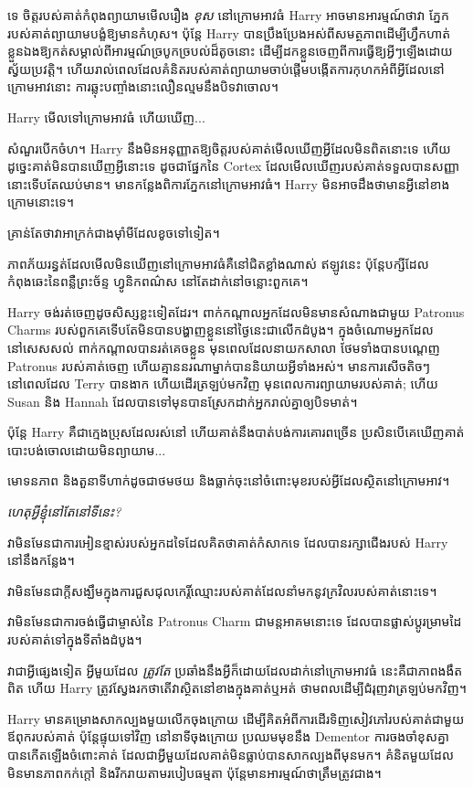 ទេ ចិត្តរបស់គាត់កំពុងព្យាយាមមើលរឿង \emph{ខុស} នៅក្រោមអាវធំ Harry អាចមានអារម្មណ៍ថាវា ភ្នែករបស់គាត់ព្យាយាមបង្ខំឱ្យមានកំហុស។ ប៉ុន្តែ Harry បានប្រឹងប្រែងអស់ពីសមត្ថភាពដើម្បីហ្វឹកហាត់ខ្លួនឯងឱ្យកត់សម្គាល់ពីអារម្មណ៍ច្របូកច្របល់ដ៏តូចនោះ ដើម្បីដកខ្លួនចេញពីការធ្វើឱ្យអ្វីៗឡើងដោយស្វ័យប្រវត្តិ។ ហើយរាល់ពេលដែលគំនិតរបស់គាត់ព្យាយាមចាប់ផ្តើមបង្កើតការកុហកអំពីអ្វីដែលនៅក្រោមអាវនោះ ការឆ្លុះបញ្ចាំងនោះលឿនល្មមនឹងបិទវាចោល។

Harry មើលទៅក្រោមអាវធំ ហើយឃើញ...

សំណួរបើកចំហ។ Harry នឹងមិនអនុញ្ញាតឱ្យចិត្តរបស់គាត់មើលឃើញអ្វីដែលមិនពិតនោះទេ ហើយដូច្នេះគាត់មិនបានឃើញអ្វីនោះទេ ដូចជាផ្នែកនៃ Cortex ដែលមើលឃើញរបស់គាត់ទទួលបានសញ្ញានោះទើបតែឈប់មាន។ មានកន្លែងពិការភ្នែកនៅក្រោមអាវធំ។ Harry មិន​អាច​ដឹង​ថា​មាន​អ្វី​នៅ​ខាង​ក្រោម​នោះ​ទេ។

គ្រាន់តែថាវាអាក្រក់ជាងម៉ាំមីដែលខូចទៅទៀត។

ភាពភ័យរន្ធត់ដែលមើលមិនឃើញនៅក្រោមអាវធំគឺនៅជិតខ្លាំងណាស់ ឥឡូវនេះ ប៉ុន្តែបក្សីដែលកំពុងឆេះនៃពន្លឺព្រះច័ន្ទ ហ្វូនិកពណ៌ស នៅតែដាក់នៅចន្លោះពួកគេ។

Harry ចង់រត់ចេញដូចសិស្សខ្លះទៀតដែរ។ ពាក់កណ្តាលអ្នកដែលមិនមានសំណាងជាមួយ Patronus Charms របស់ពួកគេទើបតែមិនបានបង្ហាញខ្លួននៅថ្ងៃនេះជាលើកដំបូង។ ក្នុងចំណោមអ្នកដែលនៅសេសសល់ ពាក់កណ្តាលបានរត់គេចខ្លួន មុនពេលដែលនាយកសាលា ថែមទាំងបានបណ្តេញ Patronus របស់គាត់ចេញ ហើយគ្មាននរណាម្នាក់បាននិយាយអ្វីទាំងអស់។ មានការសើចតិចៗ នៅពេលដែល Terry បានងាក ហើយដើរត្រឡប់មកវិញ មុនពេលការព្យាយាមរបស់គាត់; ហើយ Susan និង Hannah ដែល​បាន​ទៅ​មុន​បាន​ស្រែក​ដាក់​អ្នក​រាល់​គ្នា​ឲ្យ​បិទ​មាត់។

ប៉ុន្តែ Harry គឺជាក្មេងប្រុសដែលរស់នៅ ហើយគាត់នឹងបាត់បង់ការគោរពច្រើន ប្រសិនបើគេឃើញគាត់បោះបង់ចោលដោយមិនព្យាយាម...

មោទនភាព និង​តួនាទី​ហាក់​ដូច​ជា​ថមថយ និង​ធ្លាក់​ចុះ​នៅ​ចំពោះ​មុខ​របស់​អ្វី​ដែល​ស្ថិត​នៅ​ក្រោម​អាវ។

\emph{ហេតុអ្វីខ្ញុំនៅតែនៅទីនេះ?}

វាមិនមែនជាការអៀនខ្មាស់របស់អ្នកដទៃដែលគិតថាគាត់កំសាកទេ ដែលបានរក្សាជើងរបស់ Harry នៅនឹងកន្លែង។

វា​មិន​មែន​ជា​ក្តី​សង្ឃឹម​ក្នុង​ការ​ជួស​ជុល​កេរ្តិ៍​ឈ្មោះ​របស់​គាត់​ដែល​នាំ​មក​នូវ​ក្រវិល​របស់​គាត់​នោះ​ទេ។

វាមិនមែនជាការចង់ធ្វើជាម្ចាស់នៃ Patronus Charm ជាមន្តអាគមនោះទេ ដែលបានផ្លាស់ប្តូរម្រាមដៃរបស់គាត់ទៅក្នុងទីតាំងដំបូង។

វាជាអ្វីផ្សេងទៀត អ្វីមួយដែល \emph{ត្រូវតែ} ប្រឆាំងនឹងអ្វីក៏ដោយដែលដាក់នៅក្រោមអាវធំ នេះគឺជាភាពងងឹតពិត ហើយ Harry ត្រូវស្វែងរកថាតើវាស្ថិតនៅខាងក្នុងគាត់ឬអត់ ថាមពលដើម្បីជំរុញវាត្រឡប់មកវិញ។

Harry មានគម្រោងសាកល្បងមួយលើកចុងក្រោយ ដើម្បីគិតអំពីការដើរទិញសៀវភៅរបស់គាត់ជាមួយឪពុករបស់គាត់ ប៉ុន្តែផ្ទុយទៅវិញ នៅនាទីចុងក្រោយ ប្រឈមមុខនឹង Dementor ការចងចាំខុសគ្នាបានកើតឡើងចំពោះគាត់ ដែលជាអ្វីមួយដែលគាត់មិនធ្លាប់បានសាកល្បងពីមុនមក។ គំនិតមួយដែលមិនមានភាពកក់ក្តៅ និងរីករាយតាមរបៀបធម្មតា ប៉ុន្តែមានអារម្មណ៍ថាត្រឹមត្រូវជាង។


